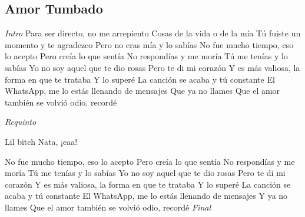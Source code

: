 \subsection{Amor Tumbado}
\noindent

\vspace{1cm}

\begin{guitar}
	\begin{multicols}{2}
		\textit{Intro}
	Para ser directo, no me arrepiento
	Cosas de la vida o de la mía
	Tú fuiste un momento y te agradezco
	Pero no eras mía y lo sabías
	No fue mucho tiempo, eso lo acepto
	Pero creía lo que sentía
	No respondías y me moría
	Tú me tenías y lo sabías
	Yo no soy aquel que te dio rosas
	Pero te di mi corazón
	Y es más valiosa, la forma en que te trataba
	Y lo superé
	La canción se acaba y tú constante
	El WhatsApp, me lo estás llenando de mensajes
	Que ya no llames
	Que el amor también se volvió odio, recordé
	\par
	\textit{Requinto}
	\par
	Lil bitch
	Nata, ¡eaa!

	\par
	No fue mucho tiempo, eso lo acepto
	Pero creía lo que sentía
	No respondías y me moría
	Tú me tenías y lo sabías
	Yo no soy aquel que te dio rosas
	Pero te di mi corazón
	Y es más valiosa, la forma en que te trataba
	Y lo superé
	La canción se acaba y tú constante
	El WhatsApp, me lo estás llenando de mensajes
	Y ya no llames
	Que el amor también se volvió odio, recordé
		\textit{Final}
	\end{multicols}
\end{guitar}
